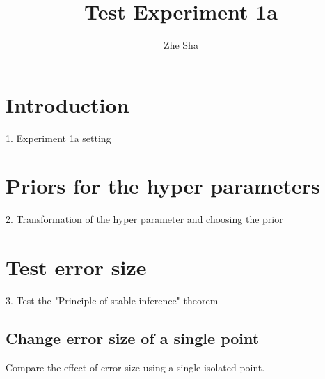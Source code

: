 \documentclass[a4paper,12pt]{article}
\begin{document}
\title{Test Experiment 1a}
\author{Zhe Sha}
\maketitle

\onehalfspacing
{}

\section{Introduction}
1.  Experiment 1a setting

\section{Priors for the hyper parameters }
2. Transformation of the hyper parameter and choosing the prior

\newpage
\section{Test error size}
3. Test the "Principle of stable inference" theorem 
\subsection{Change error size of a single point}
 Compare the effect of error size using a single isolated point.
 
\end{document}
